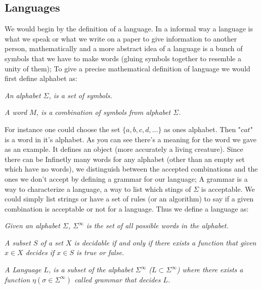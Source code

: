 \documentclass[10pt,a4paper]{article}
\begin{document}
                \subsection{Languages}
                    We would begin by the definition of a language. In a informal way a language is what we speak or what we write on a paper to give information to another person, mathematically and a more abstract idea of a language is a bunch of symbols that we have to make words (gluing symbols together to resemble a unity of them); To give a precise mathematical definition of language we would first define alphabet as:
                    \begin{define}
                        \textit{An alphabet $\Sigma$, is a set of symbols.}
                    \end{define}
                    \begin{define}
                        \textit{A word $M$, is a combination of symbols from alphabet $\Sigma$.}
                    \end{define}
                    For instance one could choose the set $\{a,b,c,d,\dots\}$ as ones alphabet. Then "$cat$" is a word in it's alphabet. As you can see there's a meaning for the word we gave as an example. It defines an object (more accurately a living creature). Since there can be Infinetly many words for any alphabet (other than an empty set which have no words), we distinguish between the accepted combinations and the ones we don't accept by defining a grammar for our language;  A grammar is a way to characterize a language, a way to list which stings of $\Sigma$ is acceptable. We could simply list strings or have a set of rules (or an algorithm) to say if a given combination is acceptable or not for a language. Thus we define a language as:
                    \begin{define}
                        \textit{Given an alphabet $\Sigma$, $\Sigma^\infty$ is the set of all possible words in the alphabet.}
                    \end{define}
                    \begin{define}
                        \textit{A subset $S$ of a set $X$ is decidable if and only if there exists a function that given $x\in X$ decides if $x\in S$ is true or false.}
                    \end{define}
                    \begin{define}
                        \textit{A Language $L$, is a subset of the alphabet $\Sigma^\infty$ ($L\subset \Sigma^\infty$) where there exists a function $\eta(\sigma\in\Sigma^\infty)$ called grammar that decides $L$.}
                    \end{define}
\end{document}
